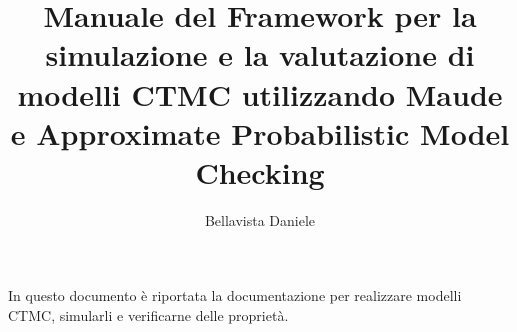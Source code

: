 \documentclass[10pt]{article}
\title{Manuale del Framework per la simulazione e la valutazione di modelli CTMC
utilizzando Maude e Approximate Probabilistic Model Checking}
\author{Bellavista Daniele}
\begin{document}
\maketitle

In questo documento è riportata la documentazione per realizzare modelli CTMC,
simularli e verificarne delle proprietà.


%



\end{document}
